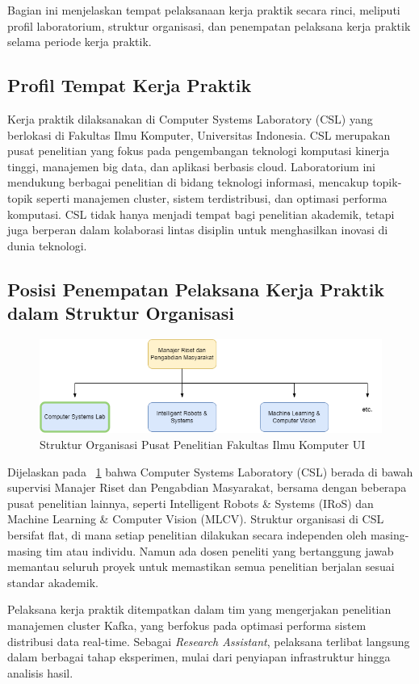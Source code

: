 Bagian ini menjelaskan tempat pelaksanaan kerja praktik secara rinci, meliputi profil laboratorium, struktur organisasi, dan penempatan pelaksana kerja praktik selama periode kerja praktik.

\subsection{Profil Tempat Kerja Praktik}
\label{sec:profil-tempat}

Kerja praktik dilaksanakan di Computer Systems Laboratory (CSL) yang berlokasi di Fakultas Ilmu Komputer, Universitas Indonesia. CSL merupakan pusat penelitian yang fokus pada pengembangan teknologi komputasi kinerja tinggi, manajemen big data, dan aplikasi berbasis cloud. Laboratorium ini mendukung berbagai penelitian di bidang teknologi informasi, mencakup topik-topik seperti manajemen cluster, sistem terdistribusi, dan optimasi performa komputasi. CSL tidak hanya menjadi tempat bagi penelitian akademik, tetapi juga berperan dalam kolaborasi lintas disiplin untuk menghasilkan inovasi di dunia teknologi.

\subsection{Posisi Penempatan Pelaksana Kerja Praktik dalam Struktur Organisasi}
\label{sec:posisi}

\vspace*{0.8cm}

\begin{figure}
	\centering
	\includegraphics[width=1\textwidth]
	{assets/pics/pacil-org.png}
	\caption{Struktur Organisasi Pusat Penelitian Fakultas Ilmu Komputer UI}
	\label{fig:pacil-org}
\end{figure}

Dijelaskan pada \pic~\ref{fig:pacil-org} bahwa Computer Systems Laboratory (CSL) berada di bawah supervisi Manajer Riset dan Pengabdian Masyarakat, bersama dengan beberapa pusat penelitian lainnya, seperti Intelligent Robots \& Systems (IRoS) dan Machine Learning \& Computer Vision (MLCV). Struktur organisasi di CSL bersifat flat, di mana setiap penelitian dilakukan secara independen oleh masing-masing tim atau individu. Namun ada dosen peneliti yang bertanggung jawab memantau seluruh proyek untuk memastikan semua penelitian berjalan sesuai standar akademik.

Pelaksana kerja praktik ditempatkan dalam tim yang mengerjakan penelitian manajemen cluster Kafka, yang berfokus pada optimasi performa sistem distribusi data real-time. Sebagai \textit{Research Assistant}, pelaksana terlibat langsung dalam berbagai tahap eksperimen, mulai dari penyiapan infrastruktur hingga analisis hasil.
